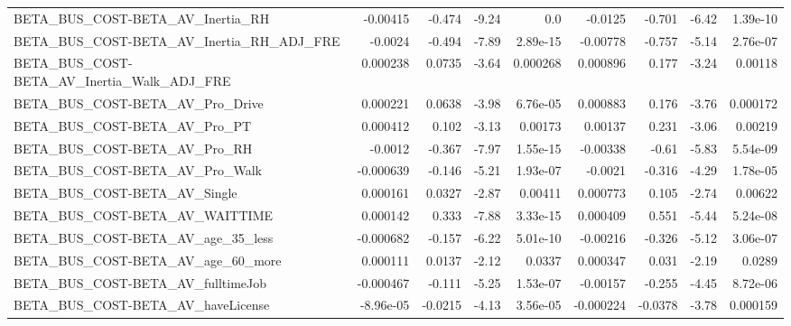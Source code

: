 \begin{tabular}{lrrrrrrrr}
BETA\_BUS\_COST-BETA\_AV\_Inertia\_RH                   &    -0.00415 &       -0.474 &    -9.24 &      0.0 &    -0.0125 &      -0.701 &        -6.42 &      1.39e-10 \\
BETA\_BUS\_COST-BETA\_AV\_Inertia\_RH\_ADJ\_FRE           &     -0.0024 &       -0.494 &    -7.89 & 2.89e-15 &   -0.00778 &      -0.757 &        -5.14 &      2.76e-07 \\
BETA\_BUS\_COST-BETA\_AV\_Inertia\_Walk\_ADJ\_FRE         &    0.000238 &       0.0735 &    -3.64 & 0.000268 &   0.000896 &       0.177 &        -3.24 &       0.00118 \\
BETA\_BUS\_COST-BETA\_AV\_Pro\_Drive                    &    0.000221 &       0.0638 &    -3.98 & 6.76e-05 &   0.000883 &       0.176 &        -3.76 &      0.000172 \\
BETA\_BUS\_COST-BETA\_AV\_Pro\_PT                       &    0.000412 &        0.102 &    -3.13 &  0.00173 &    0.00137 &       0.231 &        -3.06 &       0.00219 \\
BETA\_BUS\_COST-BETA\_AV\_Pro\_RH                       &     -0.0012 &       -0.367 &    -7.97 & 1.55e-15 &   -0.00338 &       -0.61 &        -5.83 &      5.54e-09 \\
BETA\_BUS\_COST-BETA\_AV\_Pro\_Walk                     &   -0.000639 &       -0.146 &    -5.21 & 1.93e-07 &    -0.0021 &      -0.316 &        -4.29 &      1.78e-05 \\
BETA\_BUS\_COST-BETA\_AV\_Single                       &    0.000161 &       0.0327 &    -2.87 &  0.00411 &   0.000773 &       0.105 &        -2.74 &       0.00622 \\
BETA\_BUS\_COST-BETA\_AV\_WAITTIME                     &    0.000142 &        0.333 &    -7.88 & 3.33e-15 &   0.000409 &       0.551 &        -5.44 &      5.24e-08 \\
BETA\_BUS\_COST-BETA\_AV\_age\_35\_less                  &   -0.000682 &       -0.157 &    -6.22 & 5.01e-10 &   -0.00216 &      -0.326 &        -5.12 &      3.06e-07 \\
BETA\_BUS\_COST-BETA\_AV\_age\_60\_more                  &    0.000111 &       0.0137 &    -2.12 &   0.0337 &   0.000347 &       0.031 &        -2.19 &        0.0289 \\
BETA\_BUS\_COST-BETA\_AV\_fulltimeJob                  &   -0.000467 &       -0.111 &    -5.25 & 1.53e-07 &   -0.00157 &      -0.255 &        -4.45 &      8.72e-06 \\
BETA\_BUS\_COST-BETA\_AV\_haveLicense                  &   -8.96e-05 &      -0.0215 &    -4.13 & 3.56e-05 &  -0.000224 &     -0.0378 &        -3.78 &      0.000159 \\

\end{tabular}
